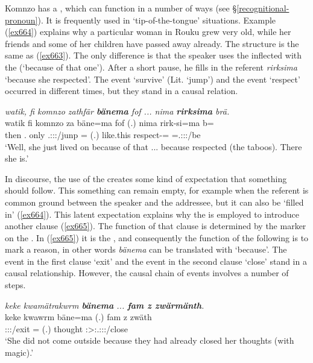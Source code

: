 Komnzo has a   , which can function in a number of ways (see \S{}\ref{recognitional-pronoun}). It is frequently used in `tip-of-the-tongue' situations. Example (\ref{ex664}) explains why a particular woman in Rouku grew very old, while her friends and some of her children have passed away already. The structure is the same as (\ref{ex663}). The only difference is that the speaker uses the  inflected with the   (`because of that one'). After a short pause, he fills in the referent \emph{rirksima} `because she respected'. The event `survive' (Lit. `jump') and the event `respect' occurred in different times, but they stand in a causal relation.

\begin{exe}
	\ex \emph{watik, fi komnzo zathfär \textbf{bänema} fof ... nima \textbf{rirksima} brä.}\\
	\gll watik fi komnzo za bäne=ma fof (.) nima rirk-si=ma b=\\
	then \Third.\Abs{} only \Tsg.\F:\Sbj:\Rpst:\Pfv/junp \Recog=\Char{} \Emph{} (.) {like.this} respect-\Nmlz=\Char{} \Med=\Tsg.\F:\Sbj:\Nonpast:\Ipfv/be\\
	\trans `Well, she just lived on because of that ... because respected (the taboos). There she is.'
	\label{ex664}
\end{exe}

In discourse, the use of the  creates some kind of expectation that something should follow. This something can remain empty, for example when the referent is common ground between the speaker and the addressee, but it can also be `filled in' (\ref{ex664}). This latent expectation explains why the  is employed to introduce another clause (\ref{ex665}). The function of that clause is determined by the  marker on the . In (\ref{ex665}) it is the  , and consequently the function of the following  is to mark a reason, in other words \emph{bänema} can be translated with `because'. The event in the first clause `exit' and the event in the second clause `close' stand in a causal relationship. However, the causal chain of events involves a number of steps.

\begin{exe}
	\ex \emph{keke kwamätrakwrm \textbf{bänema} ... \textbf{fam z zwärmänth}.}\\
	\gll keke kwawrm bäne=ma (.) fam z zwäth\\
	\Neg{} \Sg:\Sbj:\Pst:\Dur/exit \Recog=\Char{} (.) thought \Iam{} \Stsg:\Sbj>\Tsg:.\F:\Obj:\Rpst:\Pfv/close\\
	\trans `She did not come outside because they had already closed her thoughts (with magic).'
	\label{ex665}
\end{exe}

